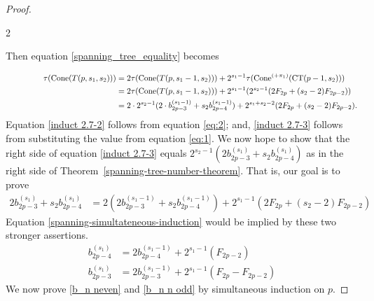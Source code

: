 \documentclass[10pt,reqno]{amsart}
\DeclareMathOperator{\Cone}{Cone}
\newcommand{\CT}[2]{\mathrm{CT}(#1,#2)}
\newcommand{\Coneplus}[1]{\mathrm{Cone}^{(+#1)}}
\begin{document}
\begin{proof}
\begin{multicols}{2}
\begin{figure}[H]
\end{figure}
\end{multicols}
    
     
     Then equation \eqref{spanning_tree_equality} becomes
    
    \begin{align}
     \tau(\Cone(T(p,s_1,s_2) ))
    &= 2\tau(\Cone(T(p,s_1-1,s_2) ))+ 2^{s_1-1}\tau (\Coneplus{\pi_1}(\CT{p-1}{s_2}))\\
\hspace{4.8cm} &= 2\tau(\Cone(T(p,s_1-1,s_2) ))+ 2^{s_1-1}(2^{s_2-1}(2F_{2p}+(s_2-2)F_{2p-2}))\label{induct 2.7-2}\\
   &= 2\cdot 2^{s_2-1}(2\cdot b_{2p-3}^{(s_1-1)} +s_2b_{2p-4}^{(s_1-1)})+2^{s_1+s_2-2}(2F_{2p}+(s_2-2)F_{2p-2})\label{induct 2.7-3}.
   \end{align}
  Equation \eqref{induct 2.7-2} follows from  equation \eqref{eq:2}; and, \eqref{induct 2.7-3} follows from substituting the value from equation \eqref{eq:1}. We now hope to show that the right side of equation \eqref{induct 2.7-3}  equals $2^{s_2-1}(2b_{2p-3}^{(s_1)} +s_2b_{2p-4}^{(s_1)})$  as in the right side of Theorem~\ref{spanning-tree-number-theorem}. That is, our goal is to prove \begin{align}\label{spanning-simultateneous-induction}
2b_{2p-3}^{(s_1)} +s_2b_{2p-4}^{(s_1)} &= 2(2b_{2p-3}^{(s_1-1)} +s_2b_{2p-4}^{(s_1-1)})+2^{s_1-1}(2F_{2p} +(s_2-2)F_{2p-2})
\end{align}
Equation \eqref{spanning-simultateneous-induction} would be implied by these two stronger assertions.
\begin{align}
b_{2p-4}^{(s_1)}&=  2b_{2p-4}^{(s_1-1)} + 2^{s_1-1}(F_{2p-2})\label{b_n neven}\\ 
b_{2p-3}^{(s_1)}&=  2b_{2p-3}^{(s_1-1)} + 2^{s_1-1}(F_{2p}-F_{2p-2})
\label{b_n n odd}\end{align}
We now prove \eqref{b_n neven} and \eqref{b_n n odd} by  simultaneous induction on $p$.  


\end{proof}
\end{document}
